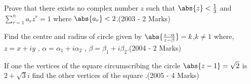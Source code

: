     \item Prove that there exists no complex number $z$ such that $\abs{z}<\frac{1}{3}$ and $\sum_{r=1}^{n}a_r z^{r}= 1$ where $\abs{a_r}<2$.\hfill (2003 - 2 Marks)
    \item Find the centre and radius  of circle given by $\abs{\frac{z-\alpha}{z-\beta}}=k$,$k\not=1$ where,$z=x+iy$ , $\alpha=\alpha_1+i\alpha_2$ , $\beta=\beta_{1}+i\beta_{2}$.\hfill(2004 - 2 Marks)
    \item If one the vertices of the square circumscribing the circle $\abs{z-1}=\sqrt{2}$ is $2+\sqrt{3}i$ find the other vertices of the square .\hfill (2005 - 4 Marks)

